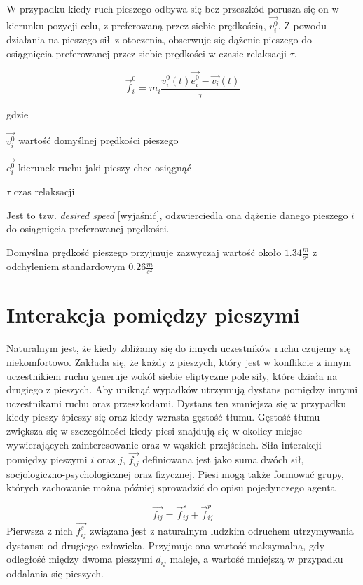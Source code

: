 W przypadku kiedy ruch pieszego odbywa się bez przeszkód porusza się on w kierunku pozycji celu, z preferowaną przez siebie prędkością, $\vec{v_{i}^{0}}$. Z powodu działania na pieszego sił~z otoczenia, obserwuje się dążenie pieszego do osiągnięcia preferowanej przez siebie prędkości w czasie relaksacji $\tau$.

\begin{equation}
\vec{f}_{i}^{0} = m_{i} \frac{v_{i}^{0}(t) \vec{e_{i}^{0}} - \vec{v_{i}}(t)}{\tau}
\end{equation}

gdzie
\begin{eqwhere}[2cm]
	\item[$\vec{v_{i}^{0}}$] wartość domyślnej prędkości pieszego
	\item[$\vec{e_{i}^{0}}$] kierunek ruchu jaki pieszy chce osiągnąć
	\item[$\tau$] czas relaksacji
\end{eqwhere}
	
Jest to tzw. \textit{desired speed} [wyjaśnić], odzwierciedla ona dążenie danego pieszego $i$ do osiągnięcia preferowanej prędkości.

Domyślna prędkość pieszego przyjmuje zazwyczaj wartość około $1.34 \frac{m}{s^{2}}$ z odchyleniem standardowym $0.26 \frac{m}{s^{2}}$ \cite{HeBuAjTw}

\section{Interakcja pomiędzy pieszymi}
\label{sec:interactionBetweenPedestrians}

Naturalnym jest, że kiedy zbliżamy się do innych uczestników ruchu czujemy się niekomfortowo. Zakłada się, że każdy z pieszych, który jest w konflikcie z innym uczestnikiem ruchu generuje wokół siebie eliptyczne pole siły, które działa na drugiego z pieszych. Aby uniknąć wypadków utrzymują dystans pomiędzy innymi uczestnikami ruchu oraz przeszkodami. Dystans ten zmniejsza się w przypadku kiedy pieszy śpieszy się oraz kiedy wzrasta gęstość tłumu. Gęstość tłumu zwiększa się w szczególności kiedy piesi znajdują się w okolicy miejsc wywierających zainteresowanie oraz w wąskich przejściach. Siła interakcji pomiędzy pieszymi $i$ oraz $j$, $\vec{f_{ij}}$ definiowana jest jako suma dwóch sił, socjologiczno-psychologicznej oraz fizycznej. Piesi mogą także formować grupy, których zachowanie można później sprowadzić do opisu pojedynczego agenta \cite{HeBuAjTw}

\begin{equation}
\vec{f_{ij}} = \vec{f}_{ij}^{s} + \vec{f}_{ij}^{p}
\end{equation}
Pierwsza z nich $\vec{f_{ij}^{s}}$ związana jest z naturalnym ludzkim odruchem utrzymywania dystansu od drugiego człowieka. Przyjmuje ona wartość maksymalną, gdy odległość między dwoma pieszymi $d_{ij}$ maleje, a wartość mniejszą w przypadku oddalania się pieszych.

